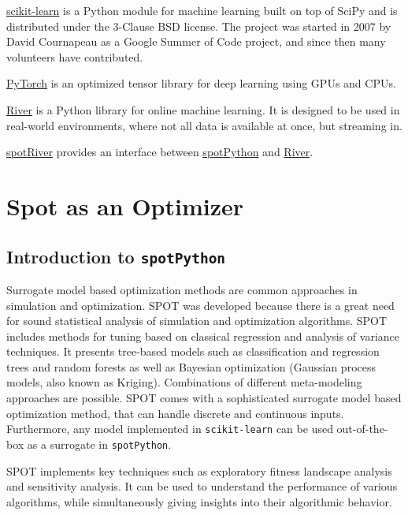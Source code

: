 \documentclass[
  letterpaper,
  DIV=11,
  numbers=noendperiod]{scrreprt}
\begin{document}
\href{https://scikit-learn.org}{scikit-learn} is a Python module for
machine learning built on top of SciPy and is distributed under the
3-Clause BSD license. The project was started in 2007 by David
Cournapeau as a Google Summer of Code project, and since then many
volunteers have contributed.

\href{https://pytorch.org}{PyTorch} is an optimized tensor library for
deep learning using GPUs and CPUs.

\href{https://riverml.xyz}{River} is a Python library for online machine
learning. It is designed to be used in real-world environments, where
not all data is available at once, but streaming in.

\href{https://github.com/sequential-parameter-optimization/spotRiver}{spotRiver}
provides an interface between
\href{https://github.com/sequential-parameter-optimization/spotPython}{spotPython}
and \href{https://riverml.xyz}{River}.

\part{Spot as an Optimizer}

\hypertarget{sec-spot}{%
\chapter{\texorpdfstring{Introduction to
\texttt{spotPython}}{Introduction to spotPython}}\label{sec-spot}}

Surrogate model based optimization methods are common approaches in
simulation and optimization. SPOT was developed because there is a great
need for sound statistical analysis of simulation and optimization
algorithms. SPOT includes methods for tuning based on classical
regression and analysis of variance techniques. It presents tree-based
models such as classification and regression trees and random forests as
well as Bayesian optimization (Gaussian process models, also known as
Kriging). Combinations of different meta-modeling approaches are
possible. SPOT comes with a sophisticated surrogate model based
optimization method, that can handle discrete and continuous inputs.
Furthermore, any model implemented in \texttt{scikit-learn} can be used
out-of-the-box as a surrogate in \texttt{spotPython}.

SPOT implements key techniques such as exploratory fitness landscape
analysis and sensitivity analysis. It can be used to understand the
performance of various algorithms, while simultaneously giving insights
into their algorithmic behavior.
\end{document}
